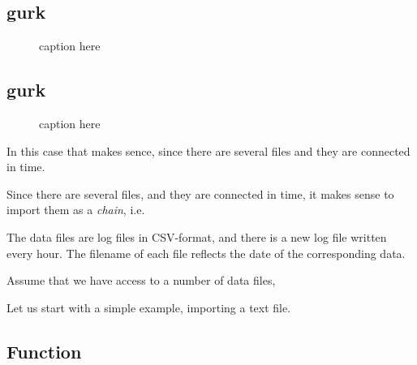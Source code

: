\documentclass[a4paper]{article}
\begin{document}
\subsection{gurk}
\begin{figure}[h!]
  \begin{center}
    
    \caption{caption here}
    \label{figure:example}
  \end{center}
\end{figure}

\subsection{gurk}
\begin{figure}[h!]
  \begin{center}
    
    \caption{caption here}
    \label{figure:example}
  \end{center}
\end{figure}



















In this case that makes sence, since there are several files and they
are connected in time.

Since there are several files, and they are
connected in time, it makes sense to import them as a \textsl{chain},
i.e.\ 


The data files are log files in CSV-format, and there is a new log
file written every hour.  The filename of each file reflects the date
of the corresponding data.




Assume that we have access to a number of data files,

Let us start with a simple example, importing a text file.







\subsection*{Function}
\end{document}
